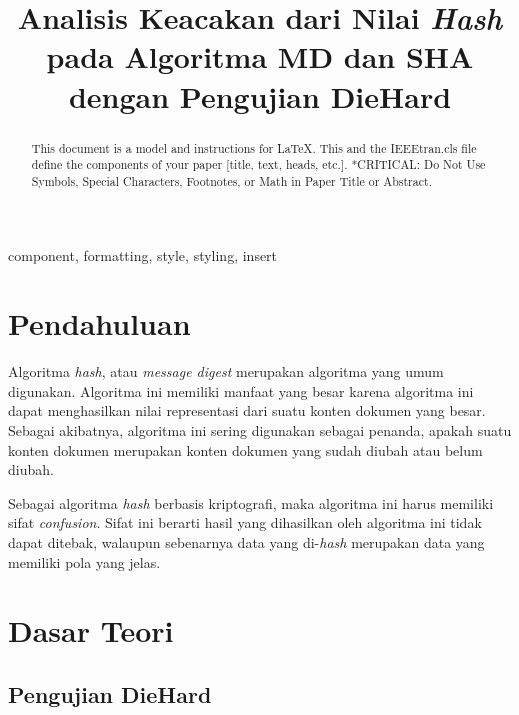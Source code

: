 \documentclass[conference]{IEEEtran}
\newcommand{\en}[1]
    {\foreignlanguage{english}{\textit{#1}}}
\begin{document}
\title{Analisis Keacakan dari Nilai \en{Hash} pada Algoritma MD dan SHA dengan Pengujian DieHard}

\author{
}

\maketitle

\begin{abstract}
    This document is a model and instructions for \LaTeX.
    This and the IEEEtran.cls file define the components of your paper [title, text, heads, etc.]. *CRITICAL: Do Not Use Symbols, Special Characters, Footnotes,
    or Math in Paper Title or Abstract.
\end{abstract}

\begin{IEEEkeywords}
    component, formatting, style, styling, insert
\end{IEEEkeywords}

\section{Pendahuluan}

Algoritma \en{hash}, atau \en{message digest} merupakan algoritma yang umum digunakan.
Algoritma ini memiliki manfaat yang besar karena algoritma ini dapat menghasilkan nilai representasi dari suatu konten dokumen yang besar.
Sebagai akibatnya, algoritma ini sering digunakan sebagai penanda, apakah suatu konten dokumen merupakan konten dokumen yang sudah diubah atau belum diubah.

Sebagai algoritma \en{hash} berbasis kriptografi, maka algoritma ini harus memiliki sifat \en{confusion}.
Sifat ini berarti hasil yang dihasilkan oleh algoritma ini tidak dapat ditebak, walaupun sebenarnya data yang di-\en{hash} merupakan data yang memiliki pola yang jelas.

\section{Dasar Teori}
\label{sec:teori}

\subsection{Pengujian DieHard}
\label{sec:teori:diehard}
\end{document}
